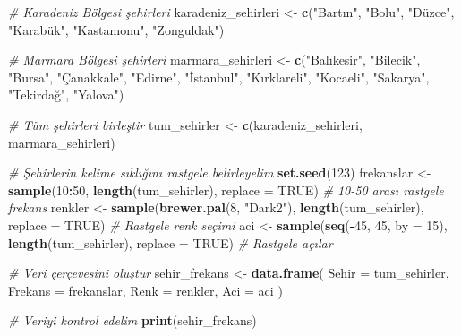 \documentclass[
]{article}
\newenvironment{Shaded}{\begin{snugshade}}{\end{snugshade}}
\newcommand{\AttributeTok}[1]{\textcolor[rgb]{0.13,0.29,0.53}{#1}}
\newcommand{\CommentTok}[1]{\textcolor[rgb]{0.56,0.35,0.01}{\textit{#1}}}
\newcommand{\ConstantTok}[1]{\textcolor[rgb]{0.56,0.35,0.01}{#1}}
\newcommand{\DecValTok}[1]{\textcolor[rgb]{0.00,0.00,0.81}{#1}}
\newcommand{\FunctionTok}[1]{\textcolor[rgb]{0.13,0.29,0.53}{\textbf{#1}}}
\newcommand{\NormalTok}[1]{#1}
\newcommand{\OtherTok}[1]{\textcolor[rgb]{0.56,0.35,0.01}{#1}}
\newcommand{\SpecialCharTok}[1]{\textcolor[rgb]{0.81,0.36,0.00}{\textbf{#1}}}
\newcommand{\StringTok}[1]{\textcolor[rgb]{0.31,0.60,0.02}{#1}}
\begin{document}
\begin{Shaded}
\begin{Highlighting}[]
\CommentTok{\# Karadeniz Bölgesi şehirleri}
\NormalTok{karadeniz\_sehirleri }\OtherTok{\textless{}{-}} \FunctionTok{c}\NormalTok{(}\StringTok{"Bartın"}\NormalTok{, }\StringTok{"Bolu"}\NormalTok{, }\StringTok{"Düzce"}\NormalTok{, }\StringTok{"Karabük"}\NormalTok{, }\StringTok{"Kastamonu"}\NormalTok{, }\StringTok{"Zonguldak"}\NormalTok{)}

\CommentTok{\# Marmara Bölgesi şehirleri}
\NormalTok{marmara\_sehirleri }\OtherTok{\textless{}{-}} \FunctionTok{c}\NormalTok{(}\StringTok{"Balıkesir"}\NormalTok{, }\StringTok{"Bilecik"}\NormalTok{, }\StringTok{"Bursa"}\NormalTok{, }\StringTok{"Çanakkale"}\NormalTok{, }\StringTok{"Edirne"}\NormalTok{, }\StringTok{"İstanbul"}\NormalTok{,}
                        \StringTok{"Kırklareli"}\NormalTok{, }\StringTok{"Kocaeli"}\NormalTok{, }\StringTok{"Sakarya"}\NormalTok{, }\StringTok{"Tekirdağ"}\NormalTok{, }\StringTok{"Yalova"}\NormalTok{)}

\CommentTok{\# Tüm şehirleri birleştir}
\NormalTok{tum\_sehirler }\OtherTok{\textless{}{-}} \FunctionTok{c}\NormalTok{(karadeniz\_sehirleri, marmara\_sehirleri)}

\CommentTok{\# Şehirlerin kelime sıklığını rastgele belirleyelim}
\FunctionTok{set.seed}\NormalTok{(}\DecValTok{123}\NormalTok{)}
\NormalTok{frekanslar }\OtherTok{\textless{}{-}} \FunctionTok{sample}\NormalTok{(}\DecValTok{10}\SpecialCharTok{:}\DecValTok{50}\NormalTok{, }\FunctionTok{length}\NormalTok{(tum\_sehirler), }\AttributeTok{replace =} \ConstantTok{TRUE}\NormalTok{)  }\CommentTok{\# 10{-}50 arası rastgele frekans}
\NormalTok{renkler }\OtherTok{\textless{}{-}} \FunctionTok{sample}\NormalTok{(}\FunctionTok{brewer.pal}\NormalTok{(}\DecValTok{8}\NormalTok{, }\StringTok{"Dark2"}\NormalTok{), }\FunctionTok{length}\NormalTok{(tum\_sehirler), }\AttributeTok{replace =} \ConstantTok{TRUE}\NormalTok{)  }\CommentTok{\# Rastgele renk seçimi}
\NormalTok{aci }\OtherTok{\textless{}{-}} \FunctionTok{sample}\NormalTok{(}\FunctionTok{seq}\NormalTok{(}\SpecialCharTok{{-}}\DecValTok{45}\NormalTok{, }\DecValTok{45}\NormalTok{, }\AttributeTok{by =} \DecValTok{15}\NormalTok{), }\FunctionTok{length}\NormalTok{(tum\_sehirler), }\AttributeTok{replace =} \ConstantTok{TRUE}\NormalTok{)  }\CommentTok{\# Rastgele açılar}

\CommentTok{\# Veri çerçevesini oluştur}
\NormalTok{sehir\_frekans }\OtherTok{\textless{}{-}} \FunctionTok{data.frame}\NormalTok{(}
  \AttributeTok{Sehir =}\NormalTok{ tum\_sehirler,}
  \AttributeTok{Frekans =}\NormalTok{ frekanslar,}
  \AttributeTok{Renk =}\NormalTok{ renkler,}
  \AttributeTok{Aci =}\NormalTok{ aci}
\NormalTok{)}

\CommentTok{\# Veriyi kontrol edelim}
\FunctionTok{print}\NormalTok{(sehir\_frekans)}
\end{Highlighting}
\end{Shaded}
\end{document}
